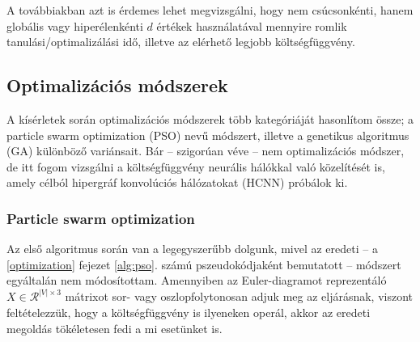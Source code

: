 A továbbiakban azt is érdemes lehet megvizsgálni, hogy nem csúcsonkénti, hanem globális vagy hiperélenkénti $d$ értékek használatával mennyire romlik tanulási/optimalizálási idő, illetve az elérhető legjobb költségfüggvény.



\subsection{Optimalizációs módszerek} \label{optimizationMethods}

A kísérletek során optimalizációs módszerek több kategóriáját hasonlítom össze; a particle swarm optimization (PSO) nevű módszert, illetve a genetikus algoritmus (GA) különböző variánsait. Bár -- szigorúan véve -- nem optimalizációs módszer, de itt fogom vizsgálni a költségfüggvény neurális hálókkal való közelítését is, amely célból hipergráf konvolúciós hálózatokat (HCNN) próbálok ki.

\subsubsection{Particle swarm optimization}
Az első algoritmus során van a legegyszerűbb dolgunk, mivel az eredeti -- a \ref{optimization} fejezet \ref{alg:pso}. számú pszeudokódjaként bemutatott -- módszert egyáltalán nem módosítottam. Amennyiben az Euler-diagramot reprezentáló $X \in \mathcal{R}^{|V| \times 3}$ mátrixot sor- vagy oszlopfolytonosan adjuk meg az eljárásnak, viszont feltételezzük, hogy a költségfüggvény is ilyeneken operál, akkor az eredeti megoldás tökéletesen fedi a mi esetünket is.

